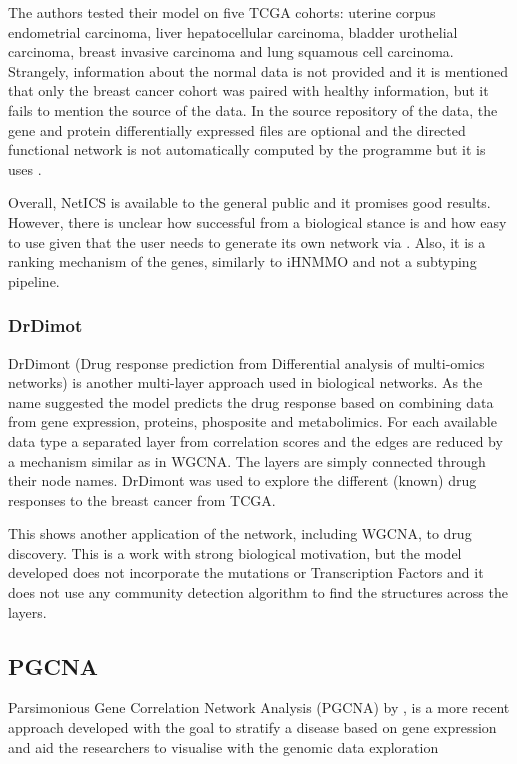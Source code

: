 The authors tested their model on five TCGA cohorts: uterine corpus endometrial carcinoma, liver hepatocellular carcinoma, bladder urothelial carcinoma, breast invasive carcinoma and lung squamous cell carcinoma. Strangely, information about the normal data is not provided and it is mentioned that only the breast cancer cohort was paired with healthy information, but it fails to mention the source of the data. In the source repository of the data, the gene and protein differentially expressed files are optional and the directed functional network is not automatically computed by the programme but it is uses \citet{Wu2010-ap}.

Overall, NetICS is available to the general public and it promises good results. However, there is unclear how successful from a biological stance is and how easy to use given that the user needs to generate its own network via \citet{Wu2010-ap}. Also, it is a ranking mechanism of the genes, similarly to iHNMMO and not a subtyping pipeline.



\subsubsection{DrDimot}

DrDimont (Drug response prediction from Differential analysis of multi-omics networks)\citet{Hiort2022-lk} is another multi-layer approach used in biological networks. As the name suggested the model predicts the drug response based on combining data from gene expression, proteins, phosposite and metabolimics. For each available data type a separated layer from correlation scores and the edges are reduced by a mechanism similar as in WGCNA. The layers are simply connected through their node names. DrDimont was used to explore the different (known) drug responses to the breast cancer from TCGA.

This shows another application of the network, including WGCNA, to drug discovery. This is a work with strong biological motivation, but the model developed does not incorporate the mutations or Transcription Factors and it does not use any community detection algorithm to find the structures across the layers.


\subsection{PGCNA}

Parsimonious Gene Correlation Network Analysis (PGCNA) by \citet{Care2019-ij}, is a more recent  approach developed with the goal to stratify a disease based on gene expression and aid the researchers to visualise with the genomic data exploration

